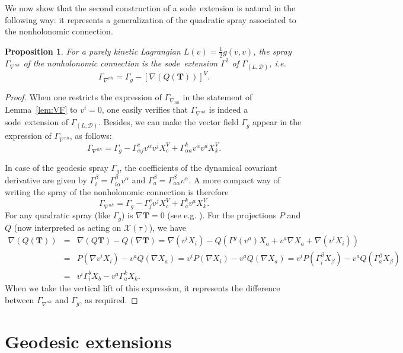 \documentclass[11pt]{article}
\newtheorem{prop}{Proposition}
\def\sode{{\sc sode}}
\def\T{{\mathbf T}}
\def\GLD{{\Gamma_{(L,\mathcal{D})}}}
\begin{document}
We now show that the second construction of a \sode\ extension is natural in the following way: it represents a generalization of the quadratic spray associated to the nonholonomic connection.
\begin{prop}  \label{prop:so}    
 For a purely kinetic Lagrangian $L(v)=\frac{1}{2}g(v,v)$,   the spray $\Gamma_{\nabla^{nh}}$ of the nonholonomic connection is the \sode\ extension $\Gamma^2$ of $\GLD$, i.e.\
$$
\Gamma_{\nabla^{nh}}=\Gamma_g-[\nabla(Q(\T))]^V.
$$
\end{prop}
\begin{proof}  When one restricts the expression of $\Gamma_{\nabla_{nh}}$ in the statement of Lemma~\ref{lem:VF} to $v^i=0$, one easily verifies that $\Gamma_{\nabla^{nh}}$ is indeed a \sode\ extension of $\GLD$. Besides, we can make the vector field $\Gamma_g$ appear in the expression of $\Gamma_{\nabla^{nh}}$, as follows:
\[   \Gamma_{\nabla^{nh}} = \Gamma_g-\Gamma^c_{\alpha j}v^\alpha v^j X_c^V+\Gamma^k_{\alpha a}v^\alpha v^a X_k^V.
\]

In case of the geodesic spray $\Gamma_g$, the coefficients of the dynamical covariant derivative are given  by $\Gamma^\beta_i=\Gamma^\beta_{i \alpha}v^\alpha$ and $\Gamma_a^\beta=\Gamma_{a \alpha}^\beta v^\alpha$. A more compact way of writing the spray of the nonholonomic connection is therefore 
$$
\Gamma_{\nabla^{nh}}= \Gamma_g-\Gamma^c_{j}v^j X_c^V+\Gamma^k_{ a} v^a X_k^V.
$$
For any quadratic spray (like $\Gamma_g$) is $\nabla\T=0$ (see e.g. \cite{derII}). For the projections $P$ and $Q$ (now interpreted as acting on $\mathcal{X}(\tau)$), we have
\begin{eqnarray*}
\nabla (Q(\T))&=& \nabla(Q\T) - Q(\nabla\T) = \nabla\left(v^i X_i\right)-Q\left(\Gamma^g\left(v^a\right) X_a+v^a \nabla X_a+\nabla\left(v^i X_i\right)\right) \\
& =&P\left(\nabla v^i X_i\right)-v^a Q\left(\nabla X_a\right) =v^{i}P\left(\nabla X_i\right)-v^a Q\left(\nabla X_a\right) 
=v^i P\left(\Gamma_i^\beta X_\beta\right)-v^a Q\left(\Gamma_a^\beta X_\beta\right) \\&=&v^i \Gamma_i^b X_b-v^a \Gamma_a^k X_k.
\end{eqnarray*}
When we take the vertical lift of this expression, it represents the difference between $\Gamma_{\nabla^{nh}}$ and  $\Gamma_g$, as required.
\end{proof}



\section{Geodesic extensions} \label{sec4}
\end{document}
